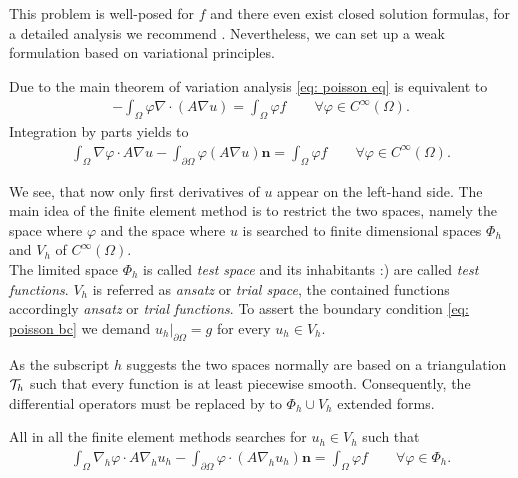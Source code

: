 This problem is well-posed  for $f$ and there even exist closed solution formulas, for a detailed analysis we recommend  \cite{evans1998}.
Nevertheless, we can set up a weak formulation based on variational principles.

Due to the main theorem of variation analysis \eqref{eq: poisson eq} is equivalent to 
\begin{align}
	-\int_\Omega \varphi \nabla \cdot (A \nabla u) = \int_\Omega \varphi f \qquad \forall \varphi \in C^\infty(\Omega).
\end{align}
Integration by parts yields to
\begin{align}
	\int_\Omega \nabla \varphi  \cdot A\nabla u -\int_{\partial \Omega} \varphi (A\nabla u) \mathbf{n}  = \int_\Omega \varphi f \qquad \forall \varphi \in C^\infty(\Omega). \label{eq: FE integration by parts}
\end{align}

We see, that now only first derivatives of $u$ appear on the left-hand side.   
The main idea of the finite element method is to restrict the two spaces, namely the space where $\varphi$ and the space where $u$ is searched  to finite dimensional spaces $\Phi_h$ and $V_h$ of $C^\infty(\Omega)$.\\
The limited space $\Phi_h$ is called \emph{test space} and its inhabitants :) are called \emph{test functions}. $V_h$ is referred as \emph{ansatz} or \emph{trial space},  the contained functions accordingly \emph{ansatz} or \emph{trial functions}. To assert the boundary condition \eqref{eq: poisson bc} we demand $u_h|_{\partial \Omega} = g$ for every $u_h \in V_h$.

As the subscript $h$ suggests the two spaces normally are based on a triangulation $\mathcal{T}_h$ such that every function is at least piecewise smooth. Consequently, the differential operators must be replaced by to $\Phi_h \cup V_h$ extended forms.

All in all the finite element methods searches for $u_h \in V_h$ such that 
\begin{align}
	\int_\Omega \nabla_h \varphi  \cdot A\nabla_h u_h -\int_{\partial \Omega} \varphi  \cdot (A\nabla_h u_h) \mathbf{n}  = \int_\Omega \varphi f \qquad \forall \varphi \in \Phi_h. \label{eq: weak formulation fe}
\end{align}

